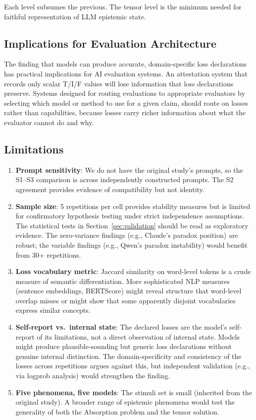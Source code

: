 Each level subsumes the previous. The tensor level is the minimum needed
for faithful representation of LLM epistemic state.

\subsection{Implications for Evaluation Architecture}

The finding that models can produce accurate, domain-specific loss
declarations has practical implications for AI evaluation systems. An
attestation system that records only scalar T/I/F values will lose
information that loss declarations preserve. Systems designed for
routing evaluations to appropriate evaluators by selecting which model
or method to use for a given claim, should route on losses rather than
capabilities, because losses carry richer information about what the
evaluator cannot do and why.

\subsection{Limitations}

\begin{enumerate}
\def\labelenumi{\arabic{enumi}.}
\item
  \textbf{Prompt sensitivity}: We do not have the original study's
  prompts, so the S1--S3 comparison is across independently constructed
  prompts. The S2 agreement provides evidence of compatibility but not
  identity.
\item
  \textbf{Sample size}: 5 repetitions per cell provides stability
  measures but is limited for confirmatory hypothesis testing under
  strict independence assumptions. The statistical tests in
  Section~\ref{sec:validation} should be read as exploratory evidence.
  The
  zero-variance findings (e.g., Claude's paradox position) are robust;
  the variable findings (e.g., Qwen's paradox instability) would benefit
  from 30+ repetitions.
\item
  \textbf{Loss vocabulary metric}: Jaccard similarity on word-level
  tokens is a crude measure of semantic differentiation. More
  sophisticated NLP measures (sentence embeddings, BERTScore) might
  reveal structure that word-level overlap misses or might show that
  some apparently disjoint vocabularies express similar concepts.
\item
  \textbf{Self-report vs.~internal state}: The declared losses are the
  model's self-report of its limitations, not a direct observation of
  internal state. Models might produce plausible-sounding but generic
  loss declarations without genuine internal distinction. The
  domain-specificity and consistency of the losses across repetitions
  argues against this, but independent validation (e.g., via logprob
  analysis) would strengthen the finding.
\item
  \textbf{Five phenomena, five models}: The stimuli set is small
  (inherited from the original study). A broader range of epistemic
  phenomena would test the generality of both the Absorption problem and
  the tensor solution.
\end{enumerate}
